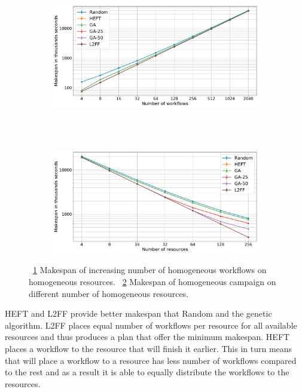 \begin{figure}[ht!]
    \centering
    \begin{subfigure}[b]{0.75\textwidth}
        \includegraphics[width=.95\textwidth]{figures/campaign/StHomoCampaigns_4StHomoResources.pdf}
        \caption{}
        \label{fig:StHomoCampaigns_4StHomoResources}
    \end{subfigure}\\
    ~ 
    \begin{subfigure}[b]{0.75\textwidth}
        \includegraphics[width=.95\textwidth]{figures/campaign/StHomoResources_StHomoCampaigns.pdf}
        \caption{}
        \label{fig:StHomoResources_StHomoCampaigns}
    \end{subfigure}
    \caption{~\ref{fig:StHomoCampaigns_4StHomoResources} Makespan of increasing number of homogeneous workflows on homogeneous resources.
    ~\ref{fig:StHomoResources_StHomoCampaigns} Makespan of homogeneous campaign on different number of homogeneous resources.}
    \label{fig:st_homog_analysis}
\end{figure}


HEFT and L2FF provide better makespan that Random and the genetic algorithm.
L2FF places equal number of workflows per resource for all available resources and thus produces a plan that offer the minimum makespan.
HEFT places a workflow to the resource that will finish it earlier.
This in turn means that will place a workflow to a resource has less number of workflows compared to the rest and as a result it is able to equally distribute the workflows to the resources.

